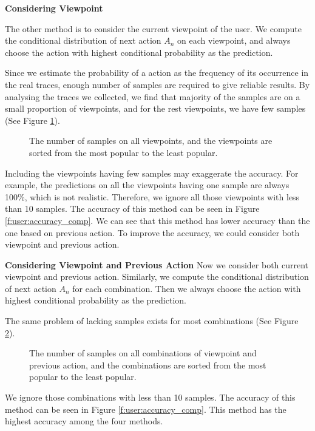 \textbf{Considering Viewpoint}

The other method is to consider the current viewpoint of the user.
We compute the conditional distribution of next action $A_n$ on each viewpoint, 
and always choose the action with highest conditional probability as the prediction.

Since we estimate the probability of a action as the frequency of its occurrence in
the real traces, enough number of samples are required to give reliable results. 
By analysing the traces we collected, we find that majority of the samples are 
on a small proportion of viewpoints, and for the rest viewpoints, we have few
samples (See Figure \ref{f:user:sample_size_1}).
\begin{figure}
    \centering
    \caption{The number of samples on all viewpoints, and the viewpoints are sorted from the most popular to the least popular.}
    \label{f:user:sample_size_1}
\end{figure}
Including the viewpoints having few samples may exaggerate the accuracy.
For example, the predictions on all the viewpoints having one sample are 
always 100\%, which is not realistic.
Therefore, we ignore all those viewpoints with less than 10 samples.
The accuracy of this method can be seen in Figure \ref{f:user:accuracy_comp}.
We can see that this method has lower accuracy than the one based on previous action.
To improve the accuracy, we could consider both viewpoint and previous action.

\textbf{Considering Viewpoint and Previous Action}
Now we consider both current viewpoint and  previous action.
Similarly, we compute the conditional distribution of next action $A_n$ for each combination. 
Then we always choose the action with highest conditional probability as the prediction.

The same problem of lacking samples exists for most combinations (See Figure \ref{f:user:sample_size_2}).
\begin{figure}
    \centering
    \caption{The number of samples on all combinations of viewpoint and previous action, and the combinations are sorted from the most popular to the least popular.}
    \label{f:user:sample_size_2}
\end{figure}
We ignore those combinations with  less than 10 samples.
The accuracy of this method can be seen in Figure \ref{f:user:accuracy_comp}.
This method has the highest accuracy among the four methods.

